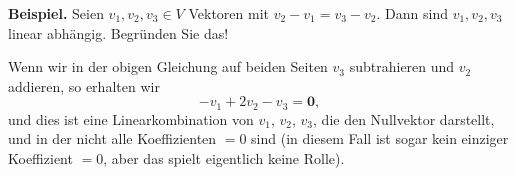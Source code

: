 \documentclass{ximera}
\begin{document}
\begin{question}
\textbf{Beispiel.}
Seien $v_1, v_2, v_3\in V$ Vektoren mit $v_2 - v_1 = v_3 - v_2$. Dann sind $v_1, v_2, v_3$ linear abhängig. Begründen Sie das!
\begin{solution}
\begin{free-response}
Wenn wir in der obigen Gleichung auf beiden Seiten $v_3$ subtrahieren und $v_2$ addieren, so erhalten wir
\[
-v_1 + 2v_2 - v_3 = \mathbf{0},
\]
und dies ist eine Linearkombination von $v_1$, $v_2$, $v_3$, die den Nullvektor darstellt, und in der nicht alle Koeffizienten $=0$ sind (in diesem Fall ist sogar kein einziger Koeffizient $=0$, aber das spielt eigentlich keine Rolle).
\end{free-response}
\end{solution}
\end{question}
\end{document}
